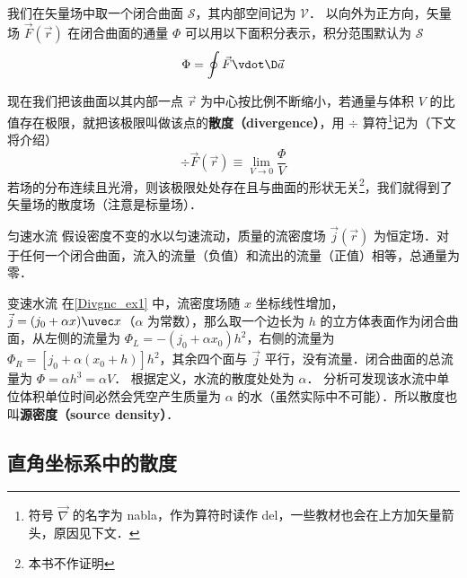 

我们在矢量场中取一个闭合曲面 $\mathcal{S}$，其内部空间记为 $\mathcal{V}$． 以向外为正方向，矢量场 $\vec F(\vec r)$ 在闭合曲面的通量 $\Phi$ 可以用以下面积分表示，积分范围默认为 $\mathcal{S}$
\begin{equation}
\Phi  = \oint {\vec F \vdot \D\vec a} 
\end{equation}

现在我们把该曲面以其内部一点 $\vec r$ 为中心按比例不断缩小，若通量与体积 $V$ 的比值存在极限，就把该极限叫做该点的\textbf{散度（divergence）}，用 $\div$ 算符\footnote{符号 $\vec\nabla$ 的名字为 nabla，作为算符时读作 del，一些教材也会在上方加矢量箭头，原因见下文．}记为（下文将介绍）
\begin{equation}\label{Divgnc_eq2}
\div \vec F(\vec r) \equiv \mathop {\lim }\limits_{V \to 0} \frac{\Phi }{V}
\end{equation}
若场的分布连续且光滑，则该极限处处存在且与曲面的形状无关\footnote{本书不作证明}，我们就得到了矢量场的散度场（注意是标量场）．

\begin{exam}{匀速水流}\label{Divgnc_ex1}
假设密度不变的水以匀速流动，质量的流密度场 $\vec j(\vec r)$ 为恒定场．对于任何一个闭合曲面，流入的流量（负值）和流出的流量（正值）相等，总通量为零．
\end{exam}

\begin{exam}{变速水流}
在\autoref{Divgnc_ex1} 中，流密度场随 $x$ 坐标线性增加， $\vec j = ({j_0} + \alpha x)\uvec x$（$\alpha$ 为常数），那么取一个边长为 $h$ 的立方体表面作为闭合曲面，从左侧的流量为 ${\Phi _L} =  - ({j_0} + \alpha {x_0}){h^2}$，右侧的流量为 ${\Phi _R} = [{j_0} + \alpha ({x_0} + h)]{h^2}$，其余四个面与 $\vec j$ 平行，没有流量．闭合曲面的总流量为 $\Phi  = \alpha {h^3} = \alpha V$． 根据定义，水流的散度处处为 $\alpha$． 分析可发现该水流中单位体积单位时间必然会凭空产生质量为 $\alpha$ 的水（虽然实际中不可能）．所以散度也叫\textbf{源密度（source density）}．
\end{exam}

\subsection{直角坐标系中的散度}

